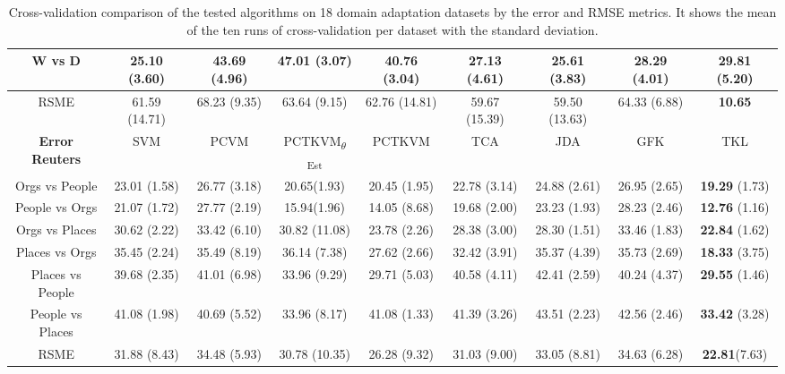 \begin{table}[]
{\begin{tabular}{@{}ccccccccc@{}}
			W vs D                 & \textbf{25.10} (3.60)& 43.69 (4.96)& 47.01 (3.07)& 40.76  (3.04)& 27.13          (4.61)& 25.61 (3.83)& 28.29 (4.01)& 29.81   (5.20)       \\\midrule
			RSME                   & 61.59          (14.71)& 68.23 (9.35)& 63.64 (9.15)& 62.76  (14.81)& 59.67          (15.39)& 59.50 (13.63)& 64.33 (6.88)& \textbf{10.65} \\\midrule
			\textbf{Error Reuters} & SVM            & PCVM  & PCTKVM\textsubscript{$\theta$Est} & PCTKVM & TCA            & JDA   & GFK   & TKL            \\
			Orgs vs People         & 23.01          (1.58)& 26.77 (3.18)& 20.65(1.93)& 20.45  (1.95)& 22.78          (3.14)& 24.88 (2.61)& 26.95 (2.65)& \textbf{19.29} (1.73)\\
			People vs Orgs         & 21.07          (1.72)& 27.77 (2.19)& 15.94(1.96)& 14.05  (8.68)& 19.68          (2.00)& 23.23 (1.93)& 28.23 (2.46)& \textbf{12.76} (1.16)\\
			Orgs vs Places         & 30.62          (2.22)& 33.42 (6.10)& 30.82 (11.08)& 23.78  (2.26)& 28.38          (3.00)& 28.30 (1.51)& 33.46 (1.83)& \textbf{22.84} (1.62)\\
			Places vs Orgs         & 35.45          (2.24)& 35.49 (8.19)& 36.14 (7.38)& 27.62  (2.66)& 32.42          (3.91)& 35.37 (4.39)& 35.73 (2.69)& \textbf{18.33} (3.75)\\
			Places vs People       & 39.68          (2.35)& 41.01 (6.98)& 33.96 (9.29)& 29.71  (5.03)& 40.58          (4.11)& 42.41 (2.59)& 40.24 (4.37)& \textbf{29.55} (1.46)\\
			People vs Places       & 41.08          (1.98)& 40.69 (5.52)& 33.96 (8.17)& 41.08  (1.33)& 41.39          (3.26)& 43.51 (2.23)& 42.56 (2.46)& \textbf{33.42} (3.28)\\\midrule
			RSME                   & 31.88          (8.43)& 34.48 (5.93)&  30.78 (10.35)& 26.28  (9.32)& 31.03          (9.00)& 33.05 (8.81)& 34.63 (6.28)& \textbf{22.81}(7.63) \\ \bottomrule
	\end{tabular}}
	\caption[Complete Cross-Validtion Result of Error]{Cross-validation comparison of the tested algorithms on 18 domain adaptation datasets by the error and \acs{RMSE} metrics. It shows the mean of the ten runs of cross-validation per dataset with the standard deviation.\label{BTableFTErr}}
\end{table}

